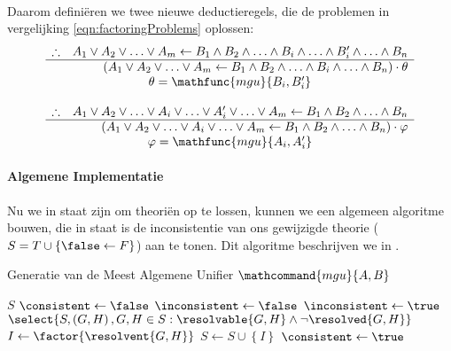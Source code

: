 \paragraph{}
Daarom definiëren we twee nieuwe deductieregels, die de problemen in vergelijking \ref{eqn:factoringProblems} oplossen:
\begin{equation}
\begin{array}{lr}
\therefore&A_1\vee A_2\vee\ldots\vee A_m\leftarrow B_1\wedge B_2\wedge\ldots\wedge B_i\wedge\ldots\wedge B_i'\wedge\ldots\wedge B_n\\
\hline
&\left(A_1\vee A_2\vee\ldots\vee A_m\leftarrow B_1\wedge B_2\wedge\ldots\wedge B_i\wedge\ldots\wedge B_n\right)\cdot\theta\\
\multicolumn{2}{c}{\theta=\mathfunc{mgu}{B_i,B_i'}}\\\\

\therefore&A_1\vee A_2\vee\ldots\vee A_i\vee\ldots\vee A_i'\vee\ldots\vee A_m\leftarrow B_1\wedge B_2\wedge\ldots\wedge B_n\\
\hline
&\left(A_1\vee A_2\vee\ldots\vee A_i\vee\ldots\vee A_m\leftarrow B_1\wedge B_2\wedge\ldots\wedge B_n\right)\cdot\varphi\\
\multicolumn{2}{c}{\varphi=\mathfunc{mgu}{A_i,A_i'}}
\end{array}
\end{equation}
\paragraph{Algemene Implementatie}
Nu we in staat zijn om theoriën op te lossen, kunnen we een algemeen algoritme bouwen, die in staat is de inconsistentie van ons gewijzigde theorie ($S=T\cup\left\{\false\leftarrow F\right\}$) aan te tonen. Dit algoritme beschrijven we in .
\begin{algorithm}[htb]
\caption{Generatie van de Meest Algemene Unifier $\mathcommand{mgu}{A,B}$}
\label{alg:resolutionSolver}
\begin{algorithmic}[1]
\REQUIRE$S$
\STATE $\consistent\leftarrow\false$
\STATE $\inconsistent\leftarrow\false$
\WHILE{$\neg\consistent\wedge\neg\inconsistent$}
\STATE$\inconsistent\leftarrow\true$
\STATE$\select{S,\left(G,H\right),G,H\in S:\resolvable{G,H}\wedge\neg\resolved{G,H}}$
\STATE$I\leftarrow\factor{\resolvent{G,H}}$
\STATE$S\leftarrow S\cup\left\{I\right\}$
\ELSE
\STATE$\consistent\leftarrow\true$
\ENDIF
\ENDWHILE
\end{algorithmic}
\end{algorithm}

